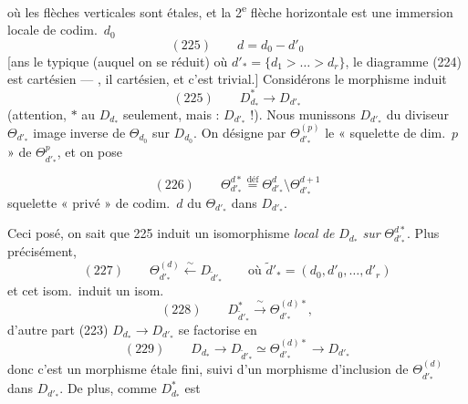 \documentclass[11pt,a4paper]{article}
\begin{document}
où les flèches verticales sont étales, et la 2\textsuperscript{e} flèche horizontale est
une immersion locale de codim.\ $d_0$  \struck{\ill{}}
\[
  (225) \qquad d = d_0 - d'_0
\]
[ans le typique (auquel on se réduit) où $d'_{*} = \{d_1 > \dots > d_r\}$,
le diagramme (224) est cartésien —  \struck{\ill{}}, il
\struck{\ill{}} \struck{\ill{}} cartésien,  et c'est trivial.]
Considérons le morphisme induit
\[
  (225) \qquad D^{*}_{d_{*}} \longrightarrow D_{d'_{*}}
\]
(attention,   $*$ au 
 $D_{d_*}$ seulement, mais : $D_{d'_*}$ !).
Nous munissons $D_{d'_*}$ du diviseur $\Theta_{d'_*}$ image inverse de $\Theta_{d_0}$
sur $D_{d_0}$. On désigne par $\Theta^{(p)}_{d'_*}$ le « squelette de dim.~$p$ » de
$\Theta^{p}_{d'_*}$, et \struck{\ill{}} on pose

\[
  (226) \qquad \Theta^{d*}_{d'_*} \overset{\text{déf}}{=} \Theta^{d}_{d'_*} \setminus \Theta^{d+1}_{d'_*}
\]
squelette « privé » de codim.~$d$ du $\Theta_{d'_*}$ dans $D_{d'_*}$.

Ceci posé, on sait que 225 induit un  isomorphisme \emph{local}
\emph{de} $D_{d_*}$ \emph{sur} \struck{\ill{}} $\Theta^{d*}_{d'_*}$. Plus
précisément, 
\[
  (227) \qquad \Theta^{(d)}_{d'_*} \xleftarrow{\ \sim\ } D_{\tilde{d}'_*}
  \qquad \text{où } \tilde{d}'_* = (d_0, d'_0, \dots, d'_r)
\]
et cet isom.\ induit un isom.
\[
  (228) \qquad D^{*}_{\tilde{d}'_*} \xrightarrow{\ \sim\ } \Theta^{(d)*}_{d'_*} ,
\]
d'autre part (223) $D_{d_*} \to D_{d'_*}$ se factorise en
\[
  (229) \qquad D_{d_*} \longrightarrow D_{\tilde{d}'_*} \simeq \Theta^{(d)*}_{d'_*} \longrightarrow D_{d'_*}
\]
donc c'est un morphisme étale fini, suivi  d'un morphisme
d'inclusion de $\Theta^{(d)}_{d'_*}$ dans $D_{d'_*}$. De plus, comme $D^{*}_{d_*}$ est
\end{document}
